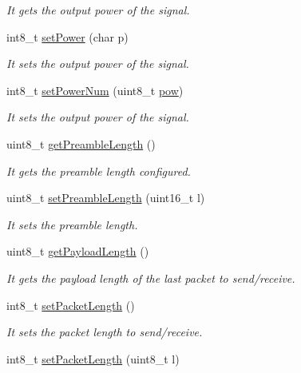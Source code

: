 \begin{DoxyCompactItemize}
\begin{DoxyCompactList}\small\item\em It gets the output power of the signal. \end{DoxyCompactList}\item 
int8\+\_\+t \hyperlink{class_wasp_s_x1272_a2a83400b06e5c4b5edac9e6909f0163b}{set\+Power} (char p)
\begin{DoxyCompactList}\small\item\em It sets the output power of the signal. \end{DoxyCompactList}\item 
int8\+\_\+t \hyperlink{class_wasp_s_x1272_a6d4e422a21ed892a8040c84d4dcd5e2c}{set\+Power\+Num} (uint8\+\_\+t \hyperlink{group__avr__math_gaa9a9885e972736204c941a7e9db0ffe2}{pow})
\begin{DoxyCompactList}\small\item\em It sets the output power of the signal. \end{DoxyCompactList}\item 
uint8\+\_\+t \hyperlink{class_wasp_s_x1272_a3a21a5a4b0b67f9e9ad8d92eb2275f68}{get\+Preamble\+Length} ()
\begin{DoxyCompactList}\small\item\em It gets the preamble length configured. \end{DoxyCompactList}\item 
uint8\+\_\+t \hyperlink{class_wasp_s_x1272_af0acf50e108ef62da463f901569a79c7}{set\+Preamble\+Length} (uint16\+\_\+t l)
\begin{DoxyCompactList}\small\item\em It sets the preamble length. \end{DoxyCompactList}\item 
uint8\+\_\+t \hyperlink{class_wasp_s_x1272_a6097316a67ccc71da2ec338d232d1af0}{get\+Payload\+Length} ()
\begin{DoxyCompactList}\small\item\em It gets the payload length of the last packet to send/receive. \end{DoxyCompactList}\item 
int8\+\_\+t \hyperlink{class_wasp_s_x1272_acfad433b86efde50154b7af55273562d}{set\+Packet\+Length} ()
\begin{DoxyCompactList}\small\item\em It sets the packet length to send/receive. \end{DoxyCompactList}\item 
int8\+\_\+t \hyperlink{class_wasp_s_x1272_a986a701e93954ecc70e7cfb020d5964f}{set\+Packet\+Length} (uint8\+\_\+t l)

\end{DoxyCompactItemize}
